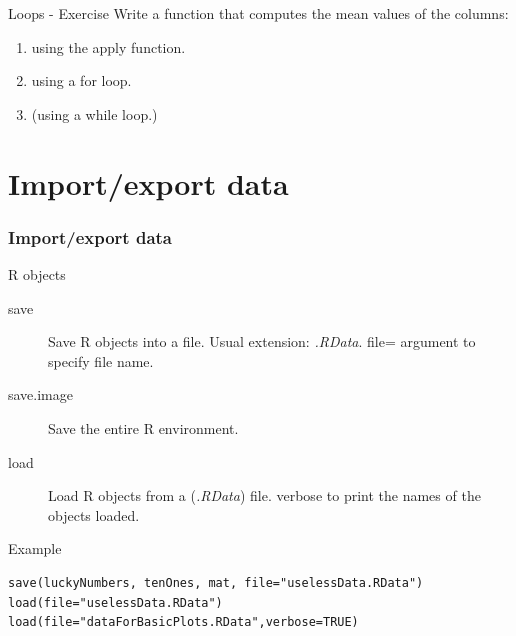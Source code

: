 \documentclass[10pt]{beamer}
\newenvironment{xframe}[2][]
  {\begin{frame}[fragile,environment=xframe,#1]
  \frametitle{#2}}
  {\end{frame}}
\begin{document}

\begin{frame}{Loops - Exercise}
  Write a function that computes the mean values of the columns:
  \begin{enumerate}
  \item using the {\sf apply}  function.
  \item using a {\sf for} loop.
  \item (using a {\sf while} loop.)
  \end{enumerate}
\end{frame}


\section{Import/export data}

\begin{xframe}{Import/export data}
  \begin{block}{R objects}
    \begin{description}
      \item[save] Save R objects into a file. Usual extension: {\it .RData}. {\sf file=} argument to specify file name.
      \item[save.image] Save the entire R environment.
      \item[load] Load R objects from a ({\it .RData}) file. {\sf verbose} to print the names of the objects loaded.
    \end{description}
  \end{block}
  \begin{exampleblock}{Example}
\begin{verbatim}
save(luckyNumbers, tenOnes, mat, file="uselessData.RData")
load(file="uselessData.RData")
load(file="dataForBasicPlots.RData",verbose=TRUE)
\end{verbatim}  
  \end{exampleblock}
\end{xframe}

\end{document}
